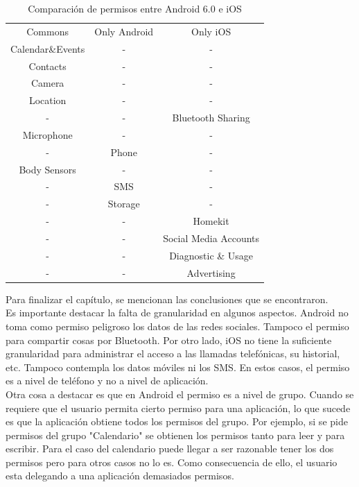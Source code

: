\begin{table}[!ht]
	\center
	\begin{tabular}{|c|c|c|}
		\hline
		\rowcolor{gray!50}
		\multicolumn{3}{|c|}{Permissions} \\					\hline
		\rowcolor{gray!50}
		Commons 	& Only Android	& Only iOS \\				\hline
		Calendar\&Events	& -		& -	\\						\hline
		Contacts	& -				& - \\						\hline
		Camera		& -				& -	\\						\hline
		Location	& -				& -	\\						\hline
		-			& -				& Bluetooth Sharing \\		\hline
		Microphone  & -				& - \\						\hline
		-			& Phone			& -	\\						\hline
		Body Sensors	& -			& - \\						\hline
		-			& SMS			& - \\						\hline
		-			& Storage		& - \\						\hline
		-			& -				& Homekit \\				\hline
		-			& -				& Social Media Accounts \\	\hline
		-			& -				& Diagnostic \& Usage \\	\hline		
		-			& -				& Advertising \\			\hline
	\end{tabular}
	\caption{Comparación de permisos entre Android 6.0 e iOS}
	\label{tab:chapter03:compPerm}
\end{table}
Para finalizar el capítulo, se mencionan las conclusiones que se encontraron.\\
Es importante destacar la falta de granularidad en algunos aspectos. Android no toma como permiso peligroso los datos de las redes sociales. Tampoco el permiso para compartir cosas por Bluetooth. Por otro lado, iOS no tiene la suficiente granularidad para administrar el acceso a las llamadas telefónicas, su historial, etc. Tampoco contempla los datos móviles ni los SMS. En estos casos, el permiso es a nivel de teléfono y no a nivel de aplicación.\\

Otra cosa a destacar es que en Android el permiso es a nivel de grupo. Cuando se requiere que el usuario permita cierto permiso para una aplicación, lo que sucede es que la aplicación obtiene todos los permisos del grupo. Por ejemplo, si se pide permisos del grupo "Calendario" se obtienen los permisos tanto para leer y para escribir. Para el caso del calendario puede llegar a ser razonable tener los dos permisos pero para otros casos no lo es. Como consecuencia de ello, el usuario esta delegando a una aplicación demasiados permisos.\\